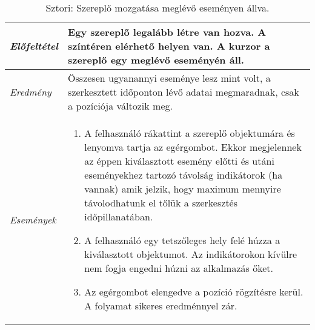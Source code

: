 \begin{table}[H]
	\centering
	\begin{tabular}{ | m{} | m{} | }
		\hline
		\emph{Előfeltétel} & Egy szereplő legalább létre van hozva. A színtéren elérhető helyen van. A kurzor a szereplő egy meglévő eseményén áll. \\
		\hline
		\emph{Eredmény} & Összesen ugyanannyi eseménye lesz mint volt, a szerkesztett időponton lévő adatai megmaradnak, csak a pozíciója változik meg. \\
		\hline
		\hline
		\emph{Események} &

		\begin{enumerate}[itemsep=-1ex]
			\item A felhasználó rákattint a szereplő objektumára és lenyomva tartja az egérgombot. Ekkor megjelennek az éppen kiválasztott esemény előtti és utáni eseményekhez tartozó távolság indikátorok (ha vannak) amik jelzik, hogy maximum mennyire távolodhatunk el tőlük a szerkesztés időpillanatában.
			\item A felhasználó egy tetszőleges hely felé húzza a kiválasztott objektumot. Az indikátorokon kívülre nem fogja engedni húzni az alkalmazás őket.
			\item Az egérgombot elengedve a pozíció rögzítésre kerül. A folyamat sikeres eredménnyel zár.
		\end{enumerate}
		\\
		\hline
	\end{tabular}
	\caption{Sztori: Szereplő mozgatása meglévő eseményen állva.}
	\label{tab:story-actor-move-on-event}
\end{table}


